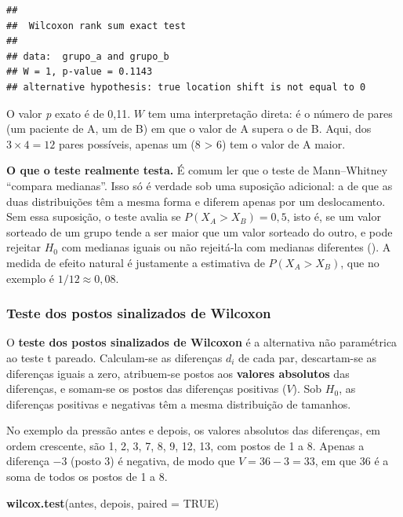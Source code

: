 \documentclass[
]{book}
\newenvironment{Shaded}{\begin{snugshade}}{\end{snugshade}}
\newcommand{\AttributeTok}[1]{\textcolor[rgb]{0.13,0.29,0.53}{#1}}
\newcommand{\ConstantTok}[1]{\textcolor[rgb]{0.56,0.35,0.01}{#1}}
\newcommand{\FunctionTok}[1]{\textcolor[rgb]{0.13,0.29,0.53}{\textbf{#1}}}
\newcommand{\NormalTok}[1]{#1}
\begin{document}
\begin{verbatim}
## 
##  Wilcoxon rank sum exact test
## 
## data:  grupo_a and grupo_b
## W = 1, p-value = 0.1143
## alternative hypothesis: true location shift is not equal to 0
\end{verbatim}

O valor \emph{p} exato é de 0,11. \(W\) tem uma interpretação direta: é o número de pares (um paciente de A, um de B) em que o valor de A supera o de B. Aqui, dos \(3 \times 4 = 12\) pares possíveis, apenas um (8 \textgreater{} 6) tem o valor de A maior.

\textbf{O que o teste realmente testa.} É comum ler que o teste de Mann--Whitney ``compara medianas''. Isso só é verdade sob uma suposição adicional: a de que as duas distribuições têm a mesma forma e diferem apenas por um deslocamento. Sem essa suposição, o teste avalia se \(P(X_A > X_B) = 0{,}5\), isto é, se um valor sorteado de um grupo tende a ser maior que um valor sorteado do outro, e pode rejeitar \(H_0\) com medianas iguais ou não rejeitá-la com medianas diferentes (). A medida de efeito natural é justamente a estimativa de \(P(X_A > X_B)\), que no exemplo é \(1/12 \approx 0{,}08\).

\subsubsection{Teste dos postos sinalizados de Wilcoxon}\label{teste-dos-postos-sinalizados-de-wilcoxon}

O \textbf{teste dos postos sinalizados de Wilcoxon} é a alternativa não paramétrica ao teste t pareado. Calculam-se as diferenças \(d_i\) de cada par, descartam-se as diferenças iguais a zero, atribuem-se postos aos \textbf{valores absolutos} das diferenças, e somam-se os postos das diferenças positivas (\(V\)). Sob \(H_0\), as diferenças positivas e negativas têm a mesma distribuição de tamanhos.

No exemplo da pressão antes e depois, os valores absolutos das diferenças, em ordem crescente, são 1, 2, 3, 7, 8, 9, 12, 13, com postos de 1 a 8. Apenas a diferença \(-3\) (posto 3) é negativa, de modo que \(V = 36 - 3 = 33\), em que 36 é a soma de todos os postos de 1 a 8.

\begin{Shaded}
\begin{Highlighting}[]
\FunctionTok{wilcox.test}\NormalTok{(antes, depois, }\AttributeTok{paired =} \ConstantTok{TRUE}\NormalTok{)}
\end{Highlighting}
\end{Shaded}
\end{document}
